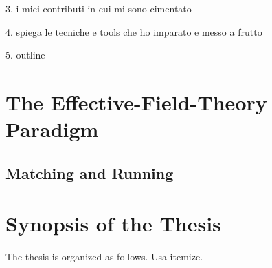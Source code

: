 3. i miei contributi in cui mi sono cimentato 

4. spiega le tecniche e tools che ho imparato e messo a frutto

5. outline

\section{The Effective-Field-Theory Paradigm}

\subsection{Matching and Running}

\section{Synopsis of the Thesis}

The thesis is organized as follows.
Usa itemize.